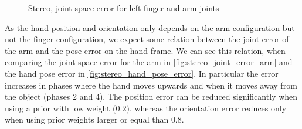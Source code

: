 \begin{figure}
\centering
{}
%
\caption{Stereo, joint space error for left finger and arm joints}
\label{fig:stereo_joint_error}
\end{figure}

As the hand position and orientation only depends on the arm configuration but not the finger configuration, we expect some relation between the joint error of the arm and the pose error on the hand frame. We can see this relation, when comparing the joint space error for the arm in \cref{fig:stereo_joint_error_arm} and the hand pose error in \cref{fig:stereo_hand_pose_error}. In particular the error increases in phases where the hand moves upwards and when it moves away from the object (phases 2 and 4). The position error can be reduced significantly when using a prior with low weight ($0.2$), whereas the orientation error reduces only when using prior weights larger or equal than $0.8$.

